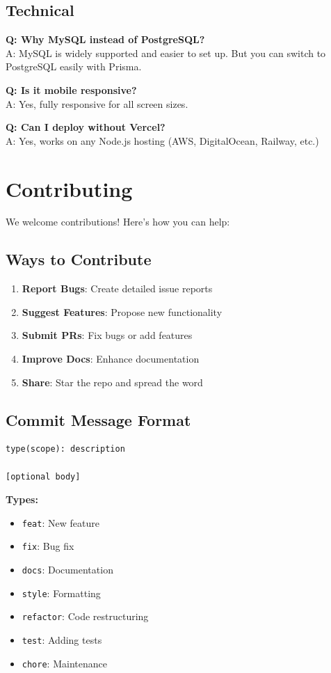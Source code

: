 \documentclass[12pt,a4paper]{article}
\begin{document}
\subsection{Technical}

\textbf{Q: Why MySQL instead of PostgreSQL?} \\
A: MySQL is widely supported and easier to set up. But you can switch to PostgreSQL easily with Prisma.

\textbf{Q: Is it mobile responsive?} \\
A: Yes, fully responsive for all screen sizes.

\textbf{Q: Can I deploy without Vercel?} \\
A: Yes, works on any Node.js hosting (AWS, DigitalOcean, Railway, etc.)

\section{Contributing}

We welcome contributions! Here's how you can help:

\subsection{Ways to Contribute}

\begin{enumerate}
    \item \textbf{Report Bugs}: Create detailed issue reports
    \item \textbf{Suggest Features}: Propose new functionality
    \item \textbf{Submit PRs}: Fix bugs or add features
    \item \textbf{Improve Docs}: Enhance documentation
    \item \textbf{Share}: Star the repo and spread the word
\end{enumerate}

\subsection{Commit Message Format}

\begin{lstlisting}
type(scope): description

[optional body]
\end{lstlisting}

\textbf{Types:}
\begin{itemize}
    \item \texttt{feat}: New feature
    \item \texttt{fix}: Bug fix
    \item \texttt{docs}: Documentation
    \item \texttt{style}: Formatting
    \item \texttt{refactor}: Code restructuring
    \item \texttt{test}: Adding tests
    \item \texttt{chore}: Maintenance
\end{itemize}
\end{document}
